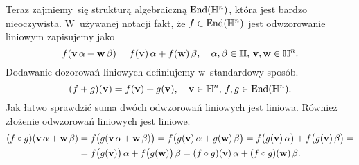 \documentclass[a4paper,11pt]{article}
\begin{document}
Teraz zajmiemy~się strukturą algebraiczną $\mathrm{End}( \mathbb{H}^{ n } )$, która jest
bardzo nieoczywista. W~używanej notacji fakt, że $f \in \mathrm{End}( \mathbb{H}^{ n } )$
jest odwzorowanie liniowym zapisujemy jako
\begin{equation}
  \label{eq:Wojtynski-68}
  f( \mathbf{v} \, \alpha + \mathbf{w} \, \beta ) =
  f( \mathbf{v} ) \, \alpha + f( \mathbf{w} ) \, \beta, \quad
  \alpha, \beta \in \mathbb{H}, \, \mathbf{v}, \mathbf{w} \in \mathbb{H}^{ n }.
\end{equation}
Dodawanie dozorowań liniowych definiujemy w~standardowy sposób.
\begin{equation}
  \label{eq:Wojtynski-69}
  ( f + g )( \mathbf{v} ) = f( \mathbf{v} ) + g( \mathbf{v} ), \quad
  \mathbf{v} \in \mathbb{H}^{ n }, \, f, g \in \mathrm{End}( \mathbb{H}^{ n } ).
\end{equation}
Jak łatwo sprawdzić suma dwóch odwzorowań liniowych jest liniowa.
Również złożenie odwzorowań liniowych jest liniowe.
\begin{equation}
  \label{eq:Wojtynski-70}
  \begin{split}
    ( f \circ g )( \mathbf{v} \, \alpha + \mathbf{w} \, \beta )
    &=
      f\big( g( \mathbf{v} \, \alpha + \mathbf{w} \, \beta ) \big) =
      f\big( g( \mathbf{v} ) \, \alpha + g( \mathbf{w} ) \, \beta \big) =
      f\big( g( \mathbf{v} ) \, \alpha \big)
      + f\big( g( \mathbf{v} ) \, \beta \big) = \\
    &=
      f\big( g( \mathbf{v} ) \big) \, \alpha
      + f\big( g( \mathbf{w} ) \big) \, \beta =
      ( f \circ g )( \mathbf{v} ) \, \alpha + ( f \circ g )( \mathbf{w} ) \, \beta.
  \end{split}
\end{equation}
\end{document}
